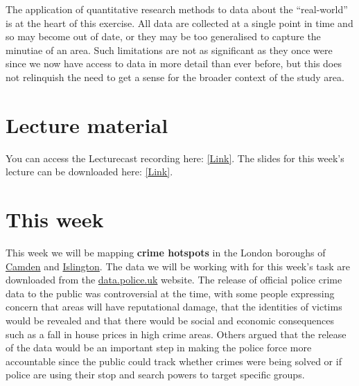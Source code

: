 \documentclass[
]{book}
\begin{document}
The application of quantitative research methods to data about the ``real-world'' is at the heart of this exercise. All data are collected at a single point in time and so may become out of date, or they may be too generalised to capture the minutiae of an area. Such limitations are not as significant as they once were since we now have access to data in more detail than ever before, but this does not relinquish the need to get a sense for the broader context of the study area.

\hypertarget{lecture-material}{%
\section*{Lecture material}\label{lecture-material}}

You can access the Lecturecast recording here: \href{https://echo360.org.uk/section/499636bf-4a88-4c90-a268-ba74bd9ef17d/home}{{[}Link{]}}. The slides for this week's lecture can be downloaded here: \href{https://github.com/jtvandijk/GEOG0030/tree/master/data/ppt/w08_gif.pdf}{{[}Link{]}}.

\hypertarget{this-week}{%
\section*{This week}\label{this-week}}

This week we will be mapping \textbf{crime hotspots} in the London boroughs of \href{https://www.google.com/maps/place/London+Borough+of+Camden,+London/@51.5428102,-0.1944449,13z/data=!3m1!4b1!4m5!3m4!1s0x48761aec186b9a3d:0x41185c626be66e0!8m2!3d51.5454736!4d-0.1627902?hl=en}{Camden} and \href{https://www.google.com/maps/place/London+Borough+of+Islington,+London/@51.5470193,-0.1444663,13z/data=!3m1!4b1!4m5!3m4!1s0x48761b5dedeb3be5:0x54f085cb18ec65c9!8m2!3d51.5465063!4d-0.1058058?hl=en}{Islington}. The data we will be working with for this week's task are downloaded from the \href{https://data.police.uk/}{data.police.uk} website. The release of official police crime data to the public was controversial at the time, with some people expressing concern that areas will have reputational damage, that the identities of victims would be revealed and that there would be social and economic consequences such as a fall in house prices in high crime areas. Others argued that the release of the data would be an important step in making the police force more accountable since the public could track whether crimes were being solved or if police are using their stop and search powers to target specific groups.
\end{document}

